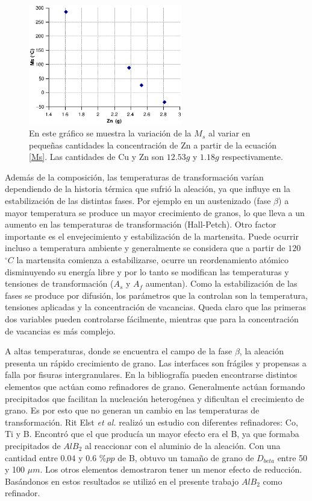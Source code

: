 \documentclass[a4paper,12pt,fleqn,twoside,openany]{book}
\begin{document}
\begin{figure}[h]
 \centering
 \includegraphics[width=0.6\textwidth]{Img/Introduccion/MsZn2.eps}
 \caption{En este gráfico se muestra la variación de la $M_s$ al variar en pequeñas cantidades la concentración de Zn a partir de la ecuación \ref{Ms}. Las cantidades de Cu y Zn son $12.53 g$ y $1.18 g$ respectivamente.}
 \label{fig:mstab}
\end{figure}


Además de la composición, las temperaturas de transformación varían dependiendo de la historia térmica que sufrió la aleación, ya que influye en la estabilización 
de las distintas fases. Por ejemplo en un austenizado (fase $\beta$) a mayor temperatura se produce un mayor crecimiento de granos, lo que lleva a un aumento en las 
temperaturas de transformación (Hall-Petch). Otro factor importante es el envejecimiento y estabilización de la martensita. Puede ocurrir incluso a temperatura ambiente y generalmente se considera que a partir de $120$ $^\circ C $ la martensita comienza 
a estabilizarse, ocurre un reordenamiento atómico disminuyendo su energía libre y por lo tanto se modifican las temperaturas y tensiones de transformación ($A_s$ y $A_f$ aumentan). Como la estabilización 
de las fases se produce por difusión, los parámetros que la controlan son la temperatura, tensiones aplicadas y la concentración de vacancias. Queda claro que las 
primeras dos variables pueden controlarse fácilmente, mientras que para la concentración de vacancias es más complejo.


A altas temperaturas, donde se encuentra el campo de la fase $\beta$, la aleación presenta un rápido crecimiento de grano. Las interfaces son frágiles y propensas 
a falla por fisuras intergranulares. En la bibliografía pueden encontrarse distintos elementos que actúan como refinadores de grano. Generalmente actúan formando 
precipitados que facilitan la nucleación heterogénea y dificultan el crecimiento de grano. Es por esto que no generan un cambio en las temperaturas de 
transformación. Rit Elst \textit{et al.} \cite{ritelst} realizó un estudio con diferentes refinadores: Co, Ti y B. Encontró que el que producía un mayor efecto era el B, 
ya que formaba precipitados de $AlB_{2}$ al reaccionar con el aluminio de la aleación. Con una cantidad entre $0.04$ y $0.6$ $\%pp$ de B, obtuvo un tamaño de grano de $D_{beta}$ entre 50 y 100 $\mu m$. Los otros elementos 
demostraron tener un menor efecto de reducción. Basándonos en estos resultados se utilizó en el presente trabajo $AlB_{2}$ como refinador.
\end{document}
